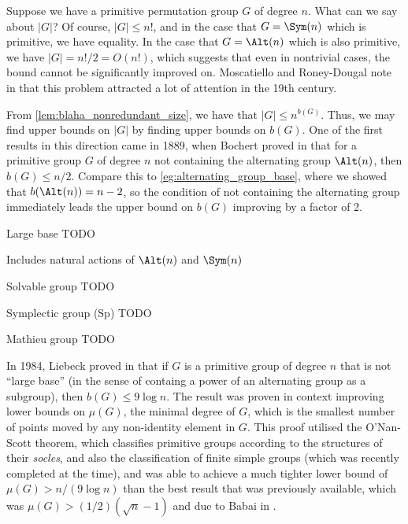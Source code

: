 Suppose we have a primitive permutation group $G$ of degree $n$. What can we say about $|G|$? Of course, $|G| \leq n!$, and in the case that $G = \Sym(n)$ which is primitive, we have equality. In the case that $G = \Alt(n)$ which is also primitive, we have $|G| = n!/2 = O(n!)$, which suggests that even in nontrivial cases, the bound cannot be significantly improved on. Moscatiello and Roney-Dougal note in \cite{moscatiello_roney-dougal2021} that this problem attracted a lot of attention in the 19th century.

From \autoref{lem:blaha_nonredundant_size}, we have that $|G| \leq n^{b(G)}$. Thus, we may find upper bounds on $|G|$ by finding upper bounds on $b(G)$. One of the first results in this direction came in 1889, when Bochert proved in \cite{bochert1889} that for a primitive group $G$ of degree $n$ not containing the alternating group $\Alt(n)$, then $b(G) \leq n/2$. Compare this to \autoref{eg:alternating_group_base}, where we showed that $b(\Alt(n)) = n-2$, so the condition of not containing the alternating group immediately leads the upper bound on $b(G)$ improving by a factor of 2.

\begin{definition}
    Large base TODO

    Includes natural actions of $\Alt(n)$ and $\Sym(n)$
\end{definition}

\begin{definition}
    Solvable group TODO
\end{definition}

\begin{definition}
    Symplectic group (Sp) TODO
\end{definition}

\begin{definition}
    Mathieu group TODO
\end{definition}

In 1984, Liebeck proved in \cite{liebeck1984} that if $G$ is a primitive group of degree $n$ that is not ``large base'' (in the sense of containg a power of an alternating group as a subgroup), then $b(G) \leq 9\log n$. The result was proven in context improving lower bounds on $\mu(G)$, the minimal degree of $G$, which is the smallest number of points moved by any non-identity element in $G$. This proof utilised the O'Nan-Scott theorem, which classifies primitive groups according to the structures of their \textit{socles}, and also the classification of finite simple groups (which was recently completed at the time), and was able to achieve a much tighter lower bound of $\mu(G) > n/(9 \log n)$ than the best result that was previously available, which was $\mu(G) > (1/2)(\sqrt{n} - 1)$ and due to Babai in \cite{babai1981}.

